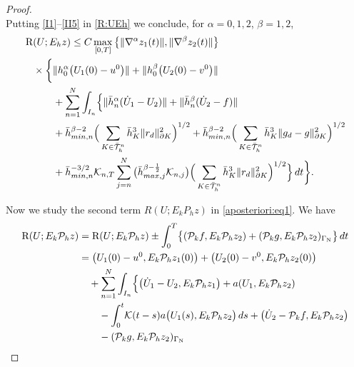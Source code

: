 \documentclass{amsart}
\numberwithin{equation}{section}
\theoremstyle{definition}
\begin{document}
\begin{proof}
\begin{equation}
\end{equation}
Putting \eqref{I1}--\eqref{II5} in \eqref{R:UEh} we conclude, 
for $\alpha=0,1,2$, $\beta=1,2$,
\begin{equation}   \label{R:UEh:estimate}
  \begin{split}
   {\text R}&(U;E_h z)
   \le C \max_{[0,T]}
    \big\{\|\nabla^\alpha z_1(t)\| , \|\nabla^\beta z_2(t)\| \big\}\\
   &\times\bigg\{
     \|h_0^\alpha \big(U_1(0)-u^0\big)\|
     +\|h_0^\beta \big(U_2(0)-v^0\big)\|\\
   &\quad\quad 
     +\sum_{n=1}^N\int_{I_n}\!\Big\{
     \| \bar h_n^\alpha (\dot U_1-U_2)\|+\| \bar h_n^\beta (\dot U_2-f)\|\\
   &\quad\quad
     +\bar h_{min,n}^{\beta-2}
     \Big(\sum_{K\in\bar{\mathcal T}_h^n}\bar h_K^3
       \|r_d\|_{\partial K}^2\Big)^{1/2}
   
     +\bar h_{min,n}^{\beta-2}
     \Big(\sum_{K\in\bar{\mathcal T}_h^n}\bar h_K^3
       \|g_d-g\|_{\partial K}^2\Big)^{1/2}\\
   &\quad\quad
      +\bar h_{min,n}^{-3/2} {\mathcal K}_{n,T}
       \sum_{j=n}^N \big( \bar h_{max,j}^{\beta-\frac{1}{2}} {\mathcal K}_{n,j}\big)
       \Big(\sum_{K\in\bar{\mathcal T}_h^n}\bar h_K^3
       \|r_d\|_{\partial K}^2\Big)^{1/2}
   \Big\}\,dt\bigg\}.
  \end{split}
\end{equation}

Now we study the second term $R(U;E_kP_hz)$ in \eqref{aposteriori:eq1}. 
We have
\begin{equation*}
  \begin{split}
   {\text R}(U;E_k{\mathcal P}_h z)
    &={\text R}(U;E_k{\mathcal P}_h z)\pm \int_0^T\!\big\{
     ({\mathcal P}_kf,E_k{\mathcal P}_hz_2)
     +({\mathcal P}_kg,E_k{\mathcal P}_hz_2)_{\Gamma_{\text N}}\big\}\,dt\\
    &=\big(U_1(0)-u^0,E_k{\mathcal P}_hz_1(0)\big)
     +\big(U_2(0)-v^0,E_k{\mathcal P}_hz_2(0)\big)\\
    &\quad+\sum_{n=1}^N\int_{I_n}\!
      \Big\{\big(\dot U_1-U_2,E_k{\mathcal P}_hz_1\big)+a(U_1,E_k{\mathcal P}_hz_2)\\
    &\quad\quad
      -\int_0^t\!{\mathcal K}(t-s)
      a\big(U_1(s),E_k{\mathcal P}_hz_2\big)\,ds+\big(\dot U_2-{\mathcal P}_kf,E_k{\mathcal P}_hz_2\big)\\
    &\quad\quad
      -({\mathcal P}_kg,E_k{\mathcal P}_hz_2)_{\Gamma_{\text N}}
   

\end{split}
\end{equation*}
\end{proof}
\end{document}
